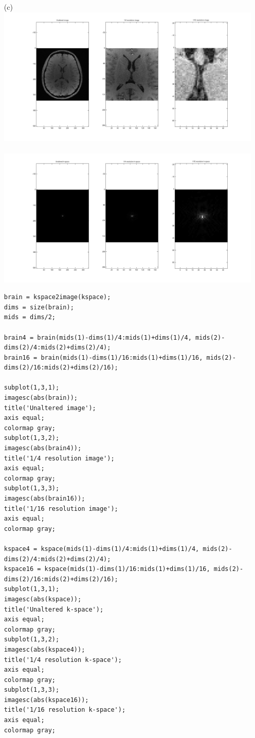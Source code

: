 \documentclass{article}
\begin{document}
\begin{enumerate}
\begin{enumerate}
	\item[(c)]
		$\;$\\ \includegraphics[width=\textwidth]{../images/BrainResolutions} \\
		$\;$\\ \includegraphics[width=\textwidth]{../images/KSpaceResolutions} \\
\newpage
\begin{lstlisting}   
brain = kspace2image(kspace); 
dims = size(brain);
mids = dims/2;

brain4 = brain(mids(1)-dims(1)/4:mids(1)+dims(1)/4, mids(2)-dims(2)/4:mids(2)+dims(2)/4);
brain16 = brain(mids(1)-dims(1)/16:mids(1)+dims(1)/16, mids(2)-dims(2)/16:mids(2)+dims(2)/16);

subplot(1,3,1);
imagesc(abs(brain));
title('Unaltered image');
axis equal;
colormap gray;
subplot(1,3,2);
imagesc(abs(brain4));
title('1/4 resolution image');
axis equal;
colormap gray;
subplot(1,3,3);
imagesc(abs(brain16));
title('1/16 resolution image');
axis equal;
colormap gray;

kspace4 = kspace(mids(1)-dims(1)/4:mids(1)+dims(1)/4, mids(2)-dims(2)/4:mids(2)+dims(2)/4);
kspace16 = kspace(mids(1)-dims(1)/16:mids(1)+dims(1)/16, mids(2)-dims(2)/16:mids(2)+dims(2)/16);
subplot(1,3,1);
imagesc(abs(kspace));
title('Unaltered k-space');
axis equal;
colormap gray;
subplot(1,3,2);
imagesc(abs(kspace4));
title('1/4 resolution k-space');
axis equal;
colormap gray;
subplot(1,3,3);
imagesc(abs(kspace16));
title('1/16 resolution k-space');
axis equal;
colormap gray;
\end{lstlisting}


\end{enumerate}
\end{enumerate}
\end{document}
